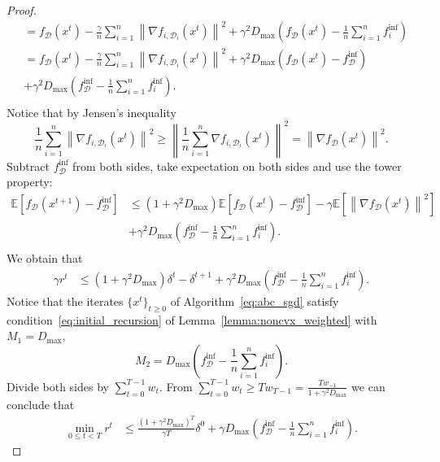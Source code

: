 \documentclass[10pt,a4paper]{amsart}
\newcommand{\Exp}[1]{{\bb E}\left[#1\right]}
\newcommand{\bb}{\mathbb}
\newcommand{\cD}{\mathcal{D}}
\newcommand{\tf}{f_{\mathcal{D}}}
\begin{document}
\begin{proof}
\begin{equation*}
\begin{split}
			& = \tf\left(x^t\right) - \frac{\gamma}{n}\sum_{i=1}^{n}\left\|\nabla f_{i, \cD_i}\left(x^t\right)\right\|^2
			+\gamma^2D_{\max}\left(\tf(x^t) - \frac{1}{n}\sum_{i=1}^{n}f_i^{\inf}\right)\\
			& = \tf\left(x^t\right) - \frac{\gamma}{n}\sum_{i=1}^{n}\left\|\nabla f_{i, \cD_i}\left(x^t\right)\right\|^2
			+\gamma^2D_{\max}\left(\tf(x^t) - \tf^{\inf}\right)\\
			& + \gamma^2D_{\max}\left(\tf^{\inf} - \frac{1}{n}\sum_{i=1}^{n}f^{\inf}_i\right).\\
		\end{split}
	\end{equation*}
	Notice that by Jensen's inequality
	\begin{equation*}
		\frac{1}{n}\sum_{i=1}^{n}\left\|\nabla f_{i, \cD_i}\left(x^t\right)\right\|^2\geq \left\|\frac{1}{n}\sum_{i=1}^{n}\nabla f_{i, \cD_i}\left(x^t\right)\right\|^2=\left\|\nabla \tf(x^t)\right\|^2.
	\end{equation*}
	Subtract $\tf^{\inf}$ from both sides, take expectation on both sides and use the tower property:
	\begin{equation*}
		\begin{split}
			\Exp{\tf\left(x^{t+1}\right) - \tf^{\inf}} & \leq \left(1 + \gamma^2D_{\max}\right)\Exp{\tf\left(x^{t}\right) - \tf^{\inf}} - \gamma \Exp{\left\|\nabla \tf\left(x^t\right)\right\|^2}\\
            &+ \gamma^2D_{\max}\left(\tf^{\inf} - \frac{1}{n}\sum_{i=1}^{n}f^{\inf}_i\right).\\
		\end{split}
	\end{equation*}
	We obtain that
	\begin{equation*}
		\begin{split}
			\gamma r^t & \leq \left(1 + \gamma^2D_{\max}\right)\delta^t- \delta^{t+1}
			+ \gamma^2D_{\max}\left(\tf^{\inf} - \frac{1}{n}\sum_{i=1}^{n}f^{\inf}_i\right).
		\end{split}
	\end{equation*}
	Notice that the iterates $\{x^t\}_{t\geq 0}$ of Algorithm~\ref{eq:abc_sgd} satisfy condition~\eqref{eq:initial_recursion} of Lemma~\ref{lemma:noncvx_weighted} with $M_1=D_{\max},$
	$$
	M_2=D_{\max}\left(\tf^{\inf} - \frac{1}{n}\sum_{i=1}^{n}f^{\inf}_i\right).
	$$
	Divide both sides by $\sum_{t=0}^{T-1}w_t.$ From $\sum_{t=0}^{T-1}w_t\geq Tw_{T-1} = \frac{Tw_{-1}}{1+\gamma^2D_{\max}}$ we can conclude that
	\begin{equation*}
		\begin{split}
			\min_{0 \leq t < T}r^t &\leq \frac{\left(1+\gamma^2 D_{\max}\right)^T}{\gamma T}\delta^0
			+ \gamma D_{\max}\left(\tf^{\inf} - \frac{1}{n}\sum_{i=1}^{n}f^{\inf}_i\right).
		\end{split}
	\end{equation*}
\end{proof}
\end{document}
